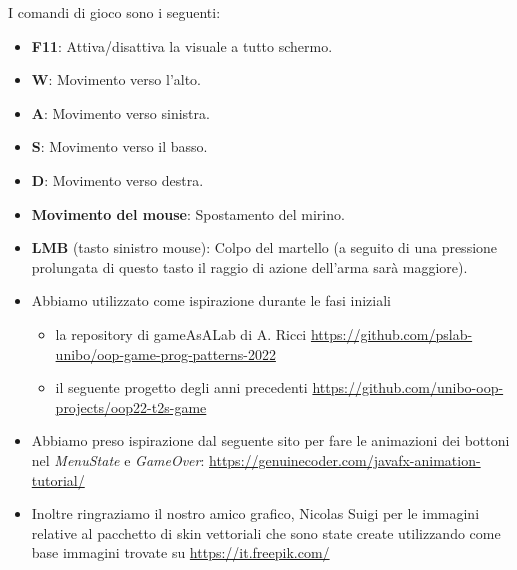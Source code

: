 \documentclass[a4paper,12pt]{report}
\begin{document}
I comandi di gioco sono i seguenti:
\begin{itemize}
    \item \textbf{F11}: Attiva/disattiva la visuale a tutto schermo.
    \item \textbf{W}: Movimento verso l'alto.
    \item \textbf{A}: Movimento verso sinistra.
    \item \textbf{S}: Movimento verso il basso.
    \item \textbf{D}: Movimento verso destra.
    \item \textbf{Movimento del mouse}: Spostamento del mirino.
    \item \textbf{LMB} (tasto sinistro mouse): Colpo del martello (a seguito di una pressione prolungata di questo tasto il raggio di azione dell'arma sarà maggiore).
\end{itemize}



\begin{itemize}
	\item Abbiamo utilizzato come ispirazione durante le fasi iniziali
    \begin{itemize}
        \item la repository di gameAsALab di A. Ricci \url{https://github.com/pslab-unibo/oop-game-prog-patterns-2022}
        \item il seguente progetto degli anni precedenti \url{https://github.com/unibo-oop-projects/oop22-t2s-game}
    \end{itemize}
    \item Abbiamo preso ispirazione dal seguente sito per fare le animazioni dei bottoni nel \emph{MenuState} e \emph{GameOver}: \url{https://genuinecoder.com/javafx-animation-tutorial/}
    \item Inoltre ringraziamo il nostro amico grafico, Nicolas Suigi per le immagini relative al pacchetto di skin vettoriali che sono state create utilizzando come base immagini trovate su \url{https://it.freepik.com/}
\end{itemize}
\end{document}
